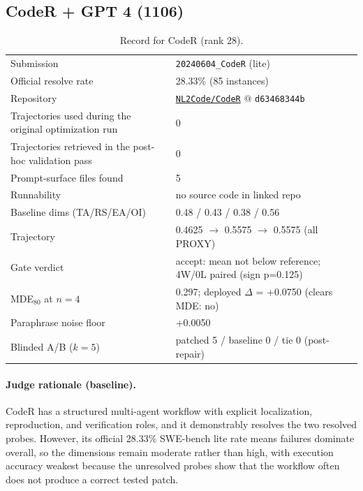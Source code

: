 \subsection{CodeR + GPT 4 (1106)}
\label{app:agent28}
\begin{table}[H]\centering\scriptsize
\caption{Record for CodeR (rank 28).}
\begin{tabular}{lp{8.2cm}}\toprule
Submission & \texttt{20240604\_\allowbreak{}CodeR} (lite) \\
Official resolve rate & 28.33\% (85 instances) \\
Repository & \href{https://github.com/NL2Code/CodeR}{\texttt{NL2Code/CodeR}} @ \texttt{d63468344b} \\
Trajectories used during the original optimization run & 0 \\
Trajectories retrieved in the post-hoc validation pass & 0 \\
Prompt-surface files found & 5 \\
Runnability & no source code in linked repo \\
Baseline dims (TA/RS/EA/OI) & 0.48 / 0.43 / 0.38 / 0.56 \\
Trajectory & 0.4625 $\to$ 0.5575 $\to$ 0.5575 (all PROXY) \\
Gate verdict & accept: mean not below reference; 4W/0L paired (sign p=0.125) \\
MDE$_{80}$ at $n{=}4$ & 0.297; deployed $\Delta$ = +0.0750 (clears MDE: no) \\
Paraphrase noise floor & +0.0050 \\
Blinded A/B ($k{=}5$) & patched 5 / baseline 0 / tie 0 (post-repair) \\
\bottomrule\end{tabular}\end{table}
\paragraph{Judge rationale (baseline).}
CodeR has a structured multi-agent workflow with explicit localization, reproduction, and verification roles, and it demonstrably resolves the two resolved probes. However, its official 28.33\% SWE-bench lite rate means failures dominate overall, so the dimensions remain moderate rather than high, with execution accuracy weakest because the unresolved probes show that the workflow often does not produce a correct tested patch.
